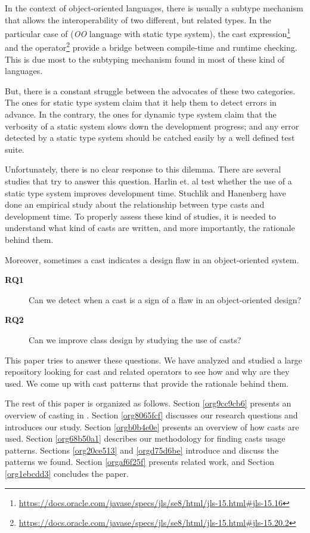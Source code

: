 \documentclass{usiinfdocprop}
\begin{document}
In the context of object-oriented languages, there is usually a subtype mechanism that allows the interoperability of two different, but related types. 
In the particular case of \java{} (\emph{OO} language with static type system), the cast expression\footnote{\url{https://docs.oracle.com/javase/specs/jls/se8/html/jls-15.html\#jls-15.16}} and the \instanceof{} operator\footnote{\url{https://docs.oracle.com/javase/specs/jls/se8/html/jls-15.html\#jls-15.20.2}} provide a bridge between compile-time and runtime checking. 
This is due most to the subtyping mechanism found in most of these kind of languages. 

But, there is a constant struggle between the advocates of these two categories. 
The ones for static type system claim that it help them to detect errors in advance. 
In the contrary, the ones for dynamic type system claim that the verbosity of a static system slows down the development progress; and any error detected by a static type system should be catched easily by a well defined test suite. 

Unfortunately, there is no clear response to this dilemma. 
There are several studies that try to answer this question. 
Harlin et. al \cite{harlin_impact_2017} test whether the use of a static type system improves development time. 
Stuchlik and Hanenberg \cite{stuchlik_static_2011} have done an empirical study about the relationship between type casts and development time. 
To properly assess these kind of studies, it is needed to understand what kind of casts are written, and more importantly, the rationale behind them. 

Moreover, sometimes a cast indicates a design flaw in an object-oriented system. 
\begin{description}
\item[{\textbf{RQ1}}] Can we detect when a cast is a sign of a flaw in an object-oriented design?
\item[{\textbf{RQ2}}] Can we improve class design by studying the use of casts?
\end{description}

This paper tries to answer these questions. 
We have analyzed and studied a large \java{} repository looking for cast and related operators to see how and why are they used. 
We come up with cast patterns that provide the rationale behind them. 

The rest of this paper is organized as follows. 
Section \ref{org9cc9cb6} presents an overview of casting in \java{}. 
Section \ref{org8065fcf} discusses our research questions and introduces our study. 
Section \ref{orgb0b4e0e} presents an overview of how casts are used. 
Section \ref{org68b50a1} describes our methodology for finding casts usage patterns. 
Sections \ref{org20ce513} and \ref{orgd75d6be} introduce and discuss the patterns we found. 
Section \ref{orgaf6f25f} presents related work, and Section \ref{org1ebcdd3} concludes the paper. 
\end{document}
